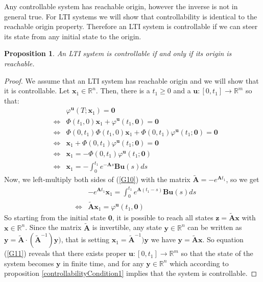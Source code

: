 \documentclass[a4paper,10pt,oneside]{book}
\newtheorem{proposition}[theorem]{Proposition}
\begin{document}
Any controllable system has reachable origin, however the inverse is not in general true. For LTI systems we will show that controllability is identical to the reachable origin property. Therefore an LTI system is controllable if we can steer its state from any initial state to the origin.
\begin{proposition}
 An LTI system is controllable if and only if its origin is reachable.
\end{proposition}
\begin{proof}
 We assume that an LTI system has reachable origin and we will show that it is controllable. Let $\mathbf{x}_1\in\mathbb{R}^n$. Then, there is a $t_1\geq 0$ and a $\mathbf{u}:[0,t_1]\to\mathbb{R}^m$ so that:
\begin{eqnarray}
&& \varphi^{\mathbf{u}}(T;\mathbf{x}_1)=\mathbf{0}\\
&\Leftrightarrow&  \Phi(t_1,0)\mathbf{x}_1+\varphi^{\mathbf{u}}(t_1,\mathbf{0})=\mathbf{0}\\
&\Leftrightarrow&  \Phi(0,t_1)\Phi(t_1,0)\mathbf{x}_1+\Phi(0,t_1)\varphi^{\mathbf{u}}(t_1;\mathbf{0})=\mathbf{0}\\
&\Leftrightarrow&  \mathbf{x}_1+\Phi(0,t_1)\varphi^{\mathbf{u}}(t_1;\mathbf{0})=\mathbf{0}\\
&\Leftrightarrow&  \mathbf{x}_1=-\Phi(0,t_1)\varphi^{\mathbf{u}}(t_1;\mathbf{0})\\
&\Leftrightarrow&  \mathbf{x}_1=-\int_0^{t_1}e^{-\mathbf{A}s}\mathbf{Bu}(s)ds\label{G10}
\end{eqnarray}
Now, we left-multiply both sides of (\ref{G10}) with the matrix $\tilde{\mathbf{A}}=-e^{\mathbf{A}t_1}$, so we get
\begin{eqnarray}
 &&  -e^{\mathbf{A}t_1}\mathbf{x}_1=\int_0^{t_1}e^{\mathbf{A}(t_1-s)}\mathbf{Bu}(s)ds\\
 &\Leftrightarrow& \tilde{\mathbf{A}}\mathbf{x}_1=\varphi^{\mathbf{u}}(t_1,\mathbf{0})\label{G11}
\end{eqnarray}
So starting from the initial state $\mathbf{0}$, it is possible to reach all states $\mathbf{z}=\tilde{\mathbf{A}}\mathbf{x}$ with $\mathbf{x}\in\mathbb{R}^n$. Since the matrix $\tilde{\mathbf{A}}$ is invertible, any state $\mathbf{y}\in\mathbb{R}^n$ can be written as $\mathbf{y}=\tilde{\mathbf{A}}\cdot(\tilde{\mathbf{A}}^{-1})\mathbf{y})$, that is setting $\mathbf{x}_1=\tilde{\mathbf{A}}^{-1})\mathbf{y}$ we have $\mathbf{y}=\tilde{\mathbf{A}}\mathbf{x}$. So equation (\ref{G11}) reveals that there exists proper $\mathbf{u}:[0,t_1]\to \mathbb{R}^m$ so that the state of the system becomes $\mathbf{y}$ in finite time, and for any $\mathbf{y}\in\mathbb{R}^n$ which according to proposition \ref{controllabilityCondition1} implies that the system is controllable.
\end{proof}
\end{document}
